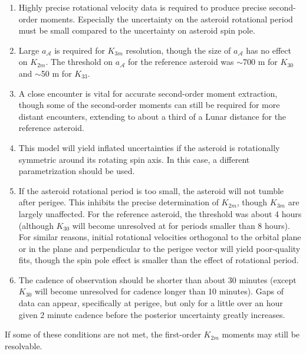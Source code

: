 \documentclass[fleqn,usenatbib]{mnras}
\begin{document}
\begin{enumerate}
  \item Highly precise rotational velocity data is required to produce precise second-order moments. Especially the uncertainty on the asteroid rotational period must be small compared to the uncertainty on asteroid spin pole.
  \item Large $a_\mathcal{A}$ is required for $K_{3m}$ resolution, though the size of $a_\mathcal{A}$ has no effect on $K_{2m}$. The threshold on $a_\mathcal{A}$ for the reference asteroid was $\sim$700 m for $K_{30}$ and $\sim$50 m for $K_{33}$.
  \item A close encounter is vital for accurate second-order moment extraction, though some of the second-order moments can still be required for more distant encounters, extending to about a third of a Lunar distance for the reference asteroid.
  \item This model will yield inflated uncertainties if the asteroid is rotationally symmetric around its rotating spin axis. In this case, a different parametrization should be used. 
  \item If the asteroid rotational period is too small, the asteroid will not tumble after perigee. This inhibits the precise determination of $K_{2m}$, though $K_{3m}$ are largely unaffected. For the reference asteroid, the threshold was about 4 hours (although $K_{30}$ will become unresolved at for periods smaller than 8 hours). For similar reasons, initial rotational velocities orthogonal to the orbital plane or in the plane and perpendicular to the perigee vector will yield poor-quality fits, though the spin pole effect is smaller than the effect of rotational period.
  \item The cadence of observation should be shorter than about 30 minutes (except $K_{30}$ will become unresolved for cadence longer than 10 minutes). Gaps of data can appear, specifically at perigee, but only for a little over an hour given 2 minute cadence before the posterior uncertainty greatly increases.
\end{enumerate}

If some of these conditions are not met, the first-order $K_{2m}$ moments may still be resolvable.
\end{document}
